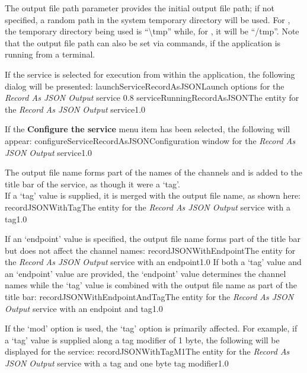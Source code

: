 The output file path parameter provides the initial output file path; if not specified, a
random path in the system temporary directory will be used.
For \win, the temporary directory being used is ``\textbackslash{}tmp'' while, for \mac{},
it will be ``/tmp''.
Note that the output file path can also be set via commands, if the application is
running from a terminal.\\

\insertStandardServiceCommands

If the service is selected for execution from within the \emph{\MMMU} application, the
following dialog will be presented:
%
{launchServiceRecordAsJSON}{Launch options for the \emph{Record As JSON Output} service}%
{0.8}
\condPage
{}%
{serviceRunningRecordAsJSON}{The \emph{\MMMU} entity for the \emph{Record As JSON Output}
service}{1.0}

If the \textbf{Configure the service} menu item has been selected, the following will
appear:
%
{configureServiceRecordAsJSON}{Configuration window for the \emph{Record As JSON Output}
service}{1.0}

The output file name forms part of the names of the channels and is added to the title bar
of the service, as though it were a `tag'.\\

If a `tag' value is supplied, it is merged with the output file name, as shown here:
%
{recordJSONWithTag}{The \emph{\MMMU} entity for the \emph{Record As JSON Output} service
with a tag}{1.0}

If an `endpoint' value is specified, the output file name forms part of the title bar but
does not affect the channel names:
%
{recordJSONWithEndpoint}{The \emph{\MMMU} entity for the \emph{Record As JSON Output}
service with an endpoint}{1.0}
\condPage{}
If both a `tag' value and an `endpoint' value are provided, the `endpoint' value
determines the channel names while the `tag' value is combined with the output file name
as part of the title bar:
%
{recordJSONWithEndpointAndTag}{The \emph{\MMMU} entity for the \emph{Record As JSON
Output} service with an endpoint and tag}{1.0}

If the `mod' option is used, the `tag' option is primarily affected.
For example, if a `tag' value is supplied along a tag modifier of 1 byte, the following
will be displayed for the service:
%
{recordJSONWithTagM1}{The \emph{\MMMU} entity for the \emph{Record As JSON Output} service
with a tag and one byte tag modifier}{1.0}

